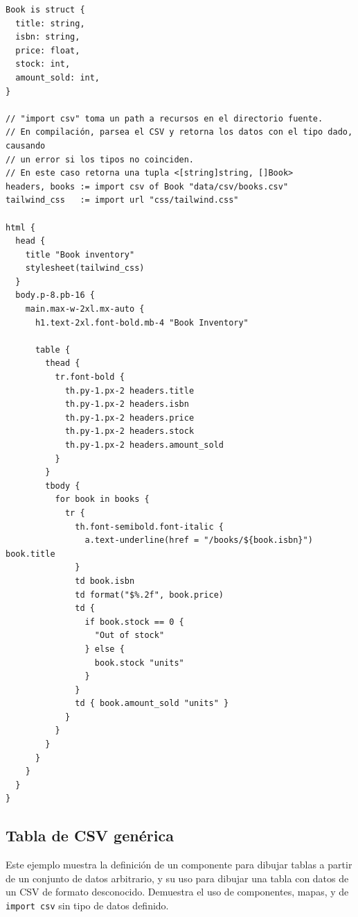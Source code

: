 \scriptsize
\begin{verbatim}
Book is struct {
  title: string,
  isbn: string,
  price: float,
  stock: int,
  amount_sold: int,
}

// "import csv" toma un path a recursos en el directorio fuente.
// En compilación, parsea el CSV y retorna los datos con el tipo dado, causando
// un error si los tipos no coinciden.
// En este caso retorna una tupla <[string]string, []Book>
headers, books := import csv of Book "data/csv/books.csv"
tailwind_css   := import url "css/tailwind.css"

html {
  head {
    title "Book inventory"
    stylesheet(tailwind_css)
  }
  body.p-8.pb-16 {
    main.max-w-2xl.mx-auto {
      h1.text-2xl.font-bold.mb-4 "Book Inventory"

      table {
        thead {
          tr.font-bold {
            th.py-1.px-2 headers.title
            th.py-1.px-2 headers.isbn
            th.py-1.px-2 headers.price
            th.py-1.px-2 headers.stock
            th.py-1.px-2 headers.amount_sold
          }
        }
        tbody {
          for book in books {
            tr {
              th.font-semibold.font-italic {
                a.text-underline(href = "/books/${book.isbn}") book.title
              }
              td book.isbn
              td format("$%.2f", book.price)
              td {
                if book.stock == 0 {
                  "Out of stock"
                } else {
                  book.stock "units"
                }
              }
              td { book.amount_sold "units" }
            }
          }
        }
      }
    }
  }
}
\end{verbatim}
\normalsize

\pagebreak
\subsection{Tabla de CSV genérica}

Este ejemplo muestra la definición de un componente para dibujar tablas a partir
de un conjunto de datos arbitrario, y su uso para dibujar una tabla con datos de
un CSV de formato desconocido. Demuestra el uso de componentes, mapas, y de
\texttt{import csv} sin tipo de datos definido.

